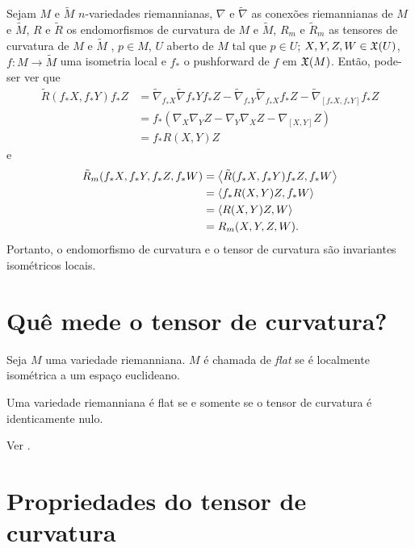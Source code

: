 \begin{demonstracao}
	Sejam $M$ e $\tilde{M}$ $n$-variedades riemannianas,
	$\nabla$ e $\tilde{\nabla}$ as conexões riemannianas de $M$ e $\tilde{M}$,
	$R$ e $\tilde{R}$ os endomorfismos de curvatura de $M$ e $\tilde{M}$,
	$R_m$ e $\tilde{R}_m$ as tensores de curvatura de $M$ e $\tilde{M}$ ,
	$p \in M$,
	$U$ aberto de $M$ tal que $p \in U$;
	$X,Y,Z,W \in \mathfrak{X}(U)$,
	$f: M \rightarrow \tilde{M}$ uma isometria local e
	$f_*$ o pushforward de $f$ em $\mathfrak{X}(M)$.
	Então, pode-ser ver que
	\begin{align*}
		\tilde{R}(f_*X, f_*Y)f_*Z &= \tilde{\nabla}_{f_*X} \tilde{\nabla} f_*Y f_*Z - \tilde{\nabla}_{f_*Y} \tilde{\nabla}_{f_*X} f_*Z - \tilde{\nabla}_{[f_*X, f_*Y]} f_*Z\\
		&= f_* \left(\nabla_X \nabla_Y Z - \nabla_Y \nabla_X Z - \nabla_{[X,Y]}Z\right)\\
		&= f_* R(X,Y)Z
	\end{align*}
	e
	\begin{align*}
		\tilde{R}_m(f_*X, f_*Y, f_*Z, f_*W)
		&= \left\langle \tilde{R}(f_*X, f_*Y)f_*Z,f_*W \right\rangle\\
		&= \left\langle f_* R(X,Y)Z,f_*W \right\rangle\\
		&= \left\langle R(X,Y)Z,W \right\rangle\\
		&= R_m(X,Y,Z,W).
	\end{align*}
	Portanto, o endomorfismo de curvatura e o tensor de curvatura são invariantes isométricos locais.
\end{demonstracao}

\section{Quê mede o tensor de curvatura?}

\begin{definicao}
	Seja $M$ uma variedade riemanniana.
	$M$ é chamada de \emph{flat} se é localmente isométrica a um espaço euclideano.
\end{definicao}

\begin{teorema}
	Uma variedade riemanniana é flat se e somente se o tensor de curvatura é identicamente nulo.
\end{teorema}

\begin{demonstracao}
	Ver \cite[Theorem 7.3]{Lee1997}.
\end{demonstracao}


\section{Propriedades do tensor de curvatura}

